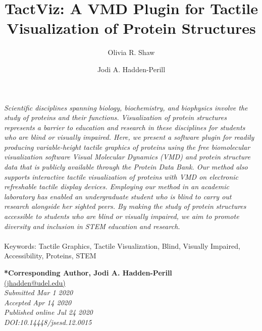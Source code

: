 \documentclass[11.5pt]{sig-alternate} %
\makeatletter
\let\oldabstract\abstract
\let\oldendabstract\endabstract
\renewenvironment{abstract} %
{\renewenvironment{quotation}%
               {\list{}{\addtolength{\leftmargin}{1em} %
                        \listparindent 1.5em%
                        \itemindent    \listparindent%
                        \rightmargin   \leftmargin%
                        \parsep        \z@ \@plus\p@}%
                \item\relax}%
               {\endlist}%
\oldabstract}
{\oldendabstract}
\makeatother
\begin{document}
\title{TactViz: A VMD Plugin for Tactile Visualization of Protein Structures}

\author[1]{\large \color{blue}Olivia R. Shaw}
\author[1]{\large \color{blue}Jodi A. Hadden-Perill}

\toappear{}
\maketitle
\begin{@twocolumnfalse} 
\begin{abstract}
\item 
\textit {Scientific disciplines spanning biology, biochemistry, and biophysics involve the study of proteins and their functions. Visualization of protein structures represents a barrier to education and research in these disciplines for students who are blind or visually impaired. Here, we present a software plugin for readily producing variable-height tactile graphics of proteins using the free biomolecular visualization software Visual Molecular Dynamics (VMD) and protein structure data that is publicly available through the Protein Data Bank. Our method also supports interactive tactile visualization of proteins with VMD on electronic refreshable tactile display devices. Employing our method in an academic laboratory has enabled an undergraduate student who is blind to carry out research alongside her sighted peers. By making the study of protein structures accessible to students who are blind or visually impaired, we aim to promote diversity and inclusion in STEM education and research.} 
\\ \\
Keywords: Tactile Graphics, Tactile Visualization, Blind, Visually Impaired, Accessibility, Proteins, STEM
\end{abstract}
\end{@twocolumnfalse}



\textbf{*Corresponding Author, Jodi A. Hadden-Perill }\\
\href{mailto: jhadden@udel.edu }{(jhadden@udel.edu)} \\
\textit{Submitted Mar 1 2020}\\
\textit{Accepted Apr 14 2020} \\
\textit{Published online Jul 24 2020} \\
\textit{DOI:10.14448/jsesd.12.0015} \\
\pagebreak
\clearpage
\end{document}
